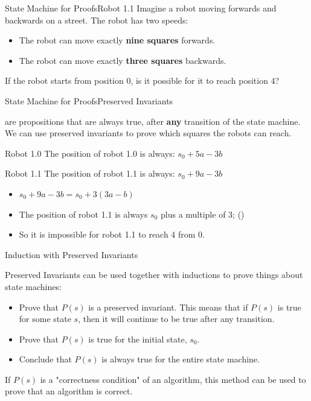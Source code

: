\begin{frame}{State Machine for Proofs}{Robot 1.1}
  Imagine a robot moving forwards and backwards on a street. The robot has two speeds:
  \begin{itemize}
    \item The robot can move exactly {\bf nine squares} forwards.
    \item The robot can move exactly {\bf three squares} backwards.
  \end{itemize}
  \bigskip

  If the robot starts from position 0, is it possible for it to reach position 4?
\end{frame}

\begin{frame}{State Machine for Proofs}{Preserved Invariants}

   are propositions that are always true, after {\bf any} transition of the state machine. We can use preserved invariants to prove which squares the robots can reach.

  \begin{block}{Robot 1.0}
    The position of robot 1.0 is always: $s_0 + 5a - 3b$
  \end{block}
  \begin{block}{Robot 1.1}
    The position of robot 1.1 is always: $s_0 + 9a - 3b$
    \begin{itemize}
      \item $s_0 + 9a - 3b = s_0 + 3(3a-b)$
      \item The position of robot 1.1 is always $s_0$ plus a multiple of 3; ()
      \item So it is impossible for robot 1.1 to reach 4 from 0.
    \end{itemize}
  \end{block}
\end{frame}


\begin{frame}{Induction with Preserved Invariants}

  Preserved Invariants can be used together with inductions to prove things about state machines:\bigskip

  \begin{itemize}
    \item Prove that $P(s)$ is a preserved invariant. This means that if $P(s)$ is true for some state $s$, then it will continue to be true after any transition.\medskip

    \item Prove that $P(s)$ is true for the initial state, $s_0$.\medskip

    \item Conclude that $P(s)$ is always true for the entire state machine.
  \end{itemize}\bigskip

  If $P(s)$ is a "correctness condition" of an algorithm, this method can be used to prove that an algorithm is correct.
\end{frame}


